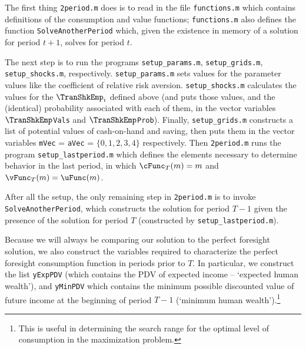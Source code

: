 \documentclass[titlepage, headings=optiontotocandhead]{\econtex}
\begin{document}
The first thing \texttt{2period.m} does is to read in the file
\texttt{functions.m} which contains definitions of the consumption and
value functions; \texttt{functions.m} also defines the function \texttt{SolveAnotherPeriod}
which, given the existence in memory of a solution for period $t+1$,
solves for period $t$.

The next step is to
run the programs \texttt{setup\_params.m}, \texttt{setup\_grids.m},
\texttt{setup\_shocks.m}, respectively. \texttt{setup\_params.m} sets values for the
parameter values like the coefficient of relative risk aversion.
\texttt{setup\_shocks.m} calculates the values for the $\TranShkEmp_{i}$
defined above (and puts those values, and the (identical) probability associated
with each of them, in the vector variables \texttt{$\TranShkEmp$Vals} and
\texttt{$\TranShkEmp$Prob}).  Finally, \texttt{setup\_grids.m} constructs a
list of potential values of cash-on-hand and saving, then puts them in the vector
variables \texttt{mVec} = \texttt{aVec} = $\{0,1,2,3,4\}$ respectively.
Then \texttt{2period.m} runs the program \texttt{setup\_lastperiod.m}
which defines the elements necessary to determine behavior in the last
period, in which $\cFunc_{T}(m)=m$ and $\vFunc_{T}(m)=\uFunc(m)$.

After all the setup, the only remaining step in
\texttt{2period.m} is to invoke \texttt{SolveAnotherPeriod}, which
constructs the solution for period $T-1$ given the presence of the
solution for period $T$ (constructed by \texttt{setup\_lastperiod.m}).

Because we will always be comparing our solution to the perfect
foresight solution, we also construct the variables required to
characterize the perfect foresight consumption function in periods
prior to $T$.  In particular, we construct the list \texttt{yExpPDV}
(which contains the PDV of expected income -- `expected human
wealth'), and \texttt{yMinPDV} which contains the minimum possible
discounted value of future income at the beginning of period $T-1$
(`minimum human wealth').\footnote{This is useful in determining the
  search range for the optimal level of consumption in the
  maximization problem.}
\end{document}
